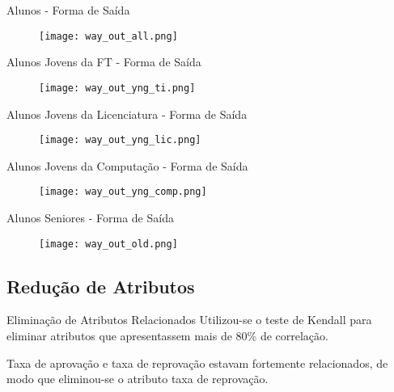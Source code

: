 \begin{frame}{Alunos - Forma de Saída}
    \begin{figure}[!ht]
        \centering
        \texttt{[image: way\_out\_all.png]}
    \end{figure}
\end{frame}

\begin{frame}{Alunos Jovens da FT - Forma de Saída}
    \begin{figure}[!ht]
        \centering
        \texttt{[image: way\_out\_yng\_ti.png]}
    \end{figure}
\end{frame}

\begin{frame}{Alunos Jovens da Licenciatura - Forma de Saída}
    \begin{figure}[!ht]
        \centering
        \texttt{[image: way\_out\_yng\_lic.png]}
    \end{figure}
\end{frame}

\begin{frame}{Alunos Jovens da Computação - Forma de Saída}
    \begin{figure}[!ht]
        \centering
        \texttt{[image: way\_out\_yng\_comp.png]}
    \end{figure}
\end{frame}

\begin{frame}{Alunos Seniores - Forma de Saída}
    \begin{figure}[!ht]
        \centering
        \texttt{[image: way\_out\_old.png]}
    \end{figure}
\end{frame}

\subsection{Redução de Atributos}
\begin{frame}{Eliminação de Atributos Relacionados}
    Utilizou-se o teste de Kendall para eliminar atributos que apresentassem mais de
    80\% de correlação. 

    \vspace{0.5cm}

    Taxa de aprovação e taxa de reprovação estavam fortemente relacionados, de modo
    que eliminou-se o atributo taxa de reprovação. 
\end{frame}

